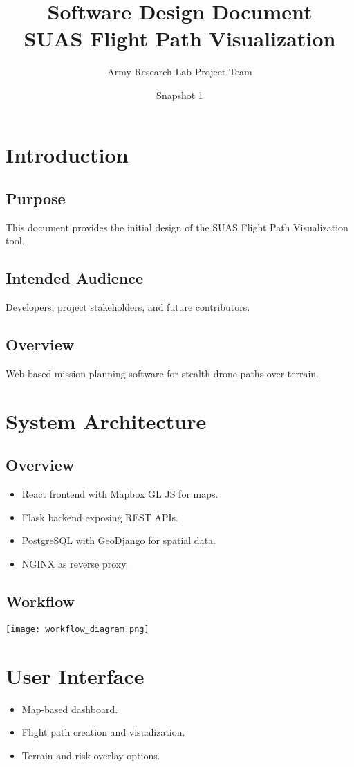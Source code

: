 \documentclass[12pt]{article}
\title{Software Design Document\\SUAS Flight Path Visualization}
\author{Army Research Lab Project Team}
\date{Snapshot 1}
\begin{document}
\maketitle

\tableofcontents
\newpage

\section{Introduction}
\subsection{Purpose}
This document provides the initial design of the SUAS Flight Path Visualization tool.

\subsection{Intended Audience}
Developers, project stakeholders, and future contributors.

\subsection{Overview}
Web-based mission planning software for stealth drone paths over terrain.

\section{System Architecture}
\subsection{Overview}
\begin{itemize}
  \item React frontend with Mapbox GL JS for maps.
  \item Flask backend exposing REST APIs.
  \item PostgreSQL with GeoDjango for spatial data.
  \item NGINX as reverse proxy.
\end{itemize}

\subsection{Workflow}
\texttt{[image: workflow\_diagram.png]}

\section{User Interface}
\begin{itemize}
  \item Map-based dashboard.
  \item Flight path creation and visualization.
  \item Terrain and risk overlay options.
\end{itemize}
\end{document}
